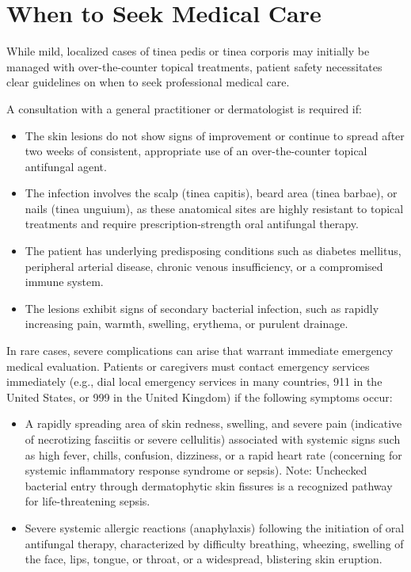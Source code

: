 \section*{When to Seek Medical Care}
While mild, localized cases of tinea pedis or tinea corporis may initially be managed with over-the-counter topical treatments, patient safety necessitates clear guidelines on when to seek professional medical care.

A consultation with a general practitioner or dermatologist is required if:
\begin{itemize}
    \item The skin lesions do not show signs of improvement or continue to spread after two weeks of consistent, appropriate use of an over-the-counter topical antifungal agent.
    \item The infection involves the scalp (tinea capitis), beard area (tinea barbae), or nails (tinea unguium), as these anatomical sites are highly resistant to topical treatments and require prescription-strength oral antifungal therapy.
    \item The patient has underlying predisposing conditions such as diabetes mellitus, peripheral arterial disease, chronic venous insufficiency, or a compromised immune system.
    \item The lesions exhibit signs of secondary bacterial infection, such as rapidly increasing pain, warmth, swelling, erythema, or purulent drainage.
\end{itemize}

In rare cases, severe complications can arise that warrant immediate emergency medical evaluation. Patients or caregivers must contact emergency services immediately (e.g., dial local emergency services in many countries, 911 in the United States, or 999 in the United Kingdom) if the following symptoms occur:
\begin{itemize}
    \item A rapidly spreading area of skin redness, swelling, and severe pain (indicative of necrotizing fasciitis or severe cellulitis) associated with systemic signs such as high fever, chills, confusion, dizziness, or a rapid heart rate (concerning for systemic inflammatory response syndrome or sepsis). Note: Unchecked bacterial entry through dermatophytic skin fissures is a recognized pathway for life-threatening sepsis.
    \item Severe systemic allergic reactions (anaphylaxis) following the initiation of oral antifungal therapy, characterized by difficulty breathing, wheezing, swelling of the face, lips, tongue, or throat, or a widespread, blistering skin eruption.
\end{itemize}

